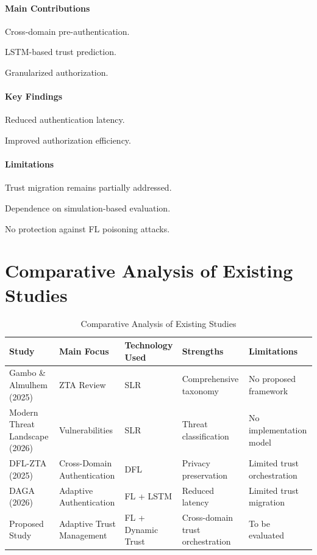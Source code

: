 \paragraph{Main Contributions}

Cross-domain pre-authentication.


LSTM-based trust prediction.


Granularized authorization.


\paragraph{Key Findings}

Reduced authentication latency.


Improved authorization efficiency.


\paragraph{Limitations}

Trust migration remains partially addressed.


Dependence on simulation-based evaluation.


No protection against FL poisoning attacks.


\section{Comparative Analysis of Existing Studies}

\begin{table}[htbp]
\centering
\caption{Comparative Analysis of Existing Studies}
\label{tab:comparative-studies}
\small
\begin{tabularx}{\textwidth}{|>{\raggedright\arraybackslash}p{2.6cm}|>{\raggedright\arraybackslash}p{2.5cm}|>{\raggedright\arraybackslash}p{2.2cm}|X|X|}
\hline
 Study & Main Focus & Technology Used & Strengths & Limitations \\ \hline
 Gambo \& Almulhem (2025) & ZTA Review & SLR & Comprehensive taxonomy & No proposed framework \\ \hline
 Modern Threat Landscape (2026) & Vulnerabilities & SLR & Threat classification & No implementation model \\ \hline
 DFL-ZTA (2025) & Cross-Domain Authentication & DFL & Privacy preservation & Limited trust orchestration \\ \hline
 DAGA (2026) & Adaptive Authentication & FL + LSTM & Reduced latency & Limited trust migration \\ \hline
 Proposed Study & Adaptive Trust Management & FL + Dynamic Trust & Cross-domain trust orchestration & To be evaluated \\ \hline
\end{tabularx}
\end{table}

